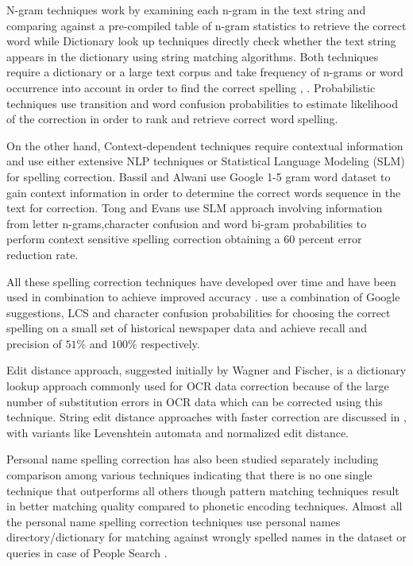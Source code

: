 \documentclass[letterpaper,11pt]{report}
\begin{document}
 N-gram techniques work by examining each n-gram in the text string and comparing against a pre-compiled table of n-gram statistics to retrieve the correct word while Dictionary look up techniques directly check whether the text string appears in the dictionary using string matching algorithms. Both techniques require a dictionary or a large text corpus and take frequency of n-grams or word occurrence into account in order to find the correct spelling \cite{strohmaier2003lexical}, \cite{ringlstetter2007text}.
 Probabilistic techniques use transition and word confusion probabilities to estimate likelihood of the correction in order to rank and retrieve correct word spelling.

On the other hand, Context-dependent techniques require contextual information and use either extensive NLP techniques or Statistical Language Modeling (SLM) for spelling correction.
Bassil and Alwani\cite{bassil2012ocr} use Google 1-5 gram word dataset to gain context information in order to determine the correct words sequence in the text for correction.
Tong and Evans\cite{tong1996statistical} use SLM approach involving information from letter n-grams,character confusion and word bi-gram probabilities to perform context sensitive spelling correction obtaining a 60 percent error reduction rate. 

All these spelling correction techniques have developed over time and have been used in combination to achieve improved accuracy \cite{brill2000improved}. \cite{agarwal2013utilizing} use a combination of Google suggestions, LCS and character confusion probabilities for choosing the correct spelling on a small set of historical newspaper data and achieve recall and precision of $51\%$ and $100\%$ respectively.


Edit distance approach, suggested initially by Wagner and Fischer\cite{wagner1974string}, is a dictionary lookup approach commonly used for OCR data correction because of the large number of substitution errors in OCR data  \cite{kukich1992techniques}\cite{christen2006comparison} which can be corrected using this technique. String edit distance approaches with faster correction are discussed in \cite{marzal1993computation},\cite{schulz2002fast}  with variants like Levenshtein automata and normalized edit distance.

Personal name spelling correction has also been studied separately including comparison among various techniques indicating that there is no one single technique that outperforms all others though pattern matching techniques result in better matching quality compared to phonetic encoding techniques\cite{christen2006comparison}. Almost all the personal name spelling correction techniques use personal names directory/dictionary for matching against wrongly spelled names in the dataset or queries in case of People Search \cite{udupa2010hashing}. 
  
\end{document}
